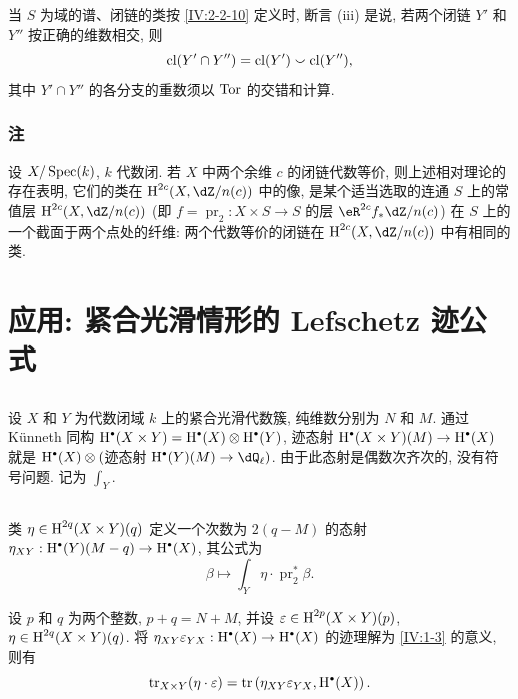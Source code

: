 当 $S$ 为域的谱、闭链的类按 \ref{IV:2-2-10} 定义时,
断言 (iii) 是说, 若两个闭链 $Y'$ 和 $Y''$ 按正确的维数相交, 则
\[
  \operatorname{cl}(Y'\cap Y'') = \operatorname{cl}(Y')\smallsmile \operatorname{cl}(Y'')\text{,}
\]
其中 $Y'\cap Y''$ 的各分支的重数须以 $\operatorname{Tor}$ 的交错和计算.

\subsubsection{注}\label{IV:2-3-10}

设 $X/\operatorname{Spec}(k)$, $k$ 代数闭. 若 $X$ 中两个余维 $c$ 的闭链代数等价,
则上述相对理论的存在表明, 它们的类在 $\h^{2 c}(X,\dZ/n(c))$ 中的像,
是某个适当选取的连通 $S$ 上的常值层 $\h^{2 c}(X,\dZ/n(c))$
(即 $f=\operatorname{pr}_2:X\times S\to S$ 的层 $\eR^{2 c} f_\ast \dZ/n(c)$)
在 $S$ 上的一个截面于两个点处的纤维:
两个代数等价的闭链在 $\h^{2 c}(X,\dZ/n(c))$ 中有相同的类.

\section{应用: 紧合光滑情形的 Lefschetz 迹公式}\label{IV:3}

\subsection{}\label{IV:3-1}

设 $X$ 和 $Y$ 为代数闭域 $k$ 上的紧合光滑代数簇, 纯维数分别为 $N$ 和 $M$.
通过 K\"unneth 同构 $\h^\bullet(X\times Y)=\h^\bullet(X)\otimes \h^\bullet(Y)$,
迹态射 $\h^\bullet(X\times Y)(M)\to \h^\bullet(X)$ 就是
$\h^\bullet(X)\otimes ($迹态射 $\h^\bullet(Y)(M)\to \dQ_\ell)$.
由于此态射是偶数次齐次的, 没有符号问题. 记为 $\int_Y$.

\subsection{}\label{IV:3-2}

类 $\eta\in \operatorname{H}^{2 q}(X\times Y)(q)$ 定义一个次数为 $2(q-M)$ 的态射
$\eta_{XY}:\h^\bullet(Y)(M-q)\to \h^\bullet(X)$, 其公式为
\[
  \beta \mapsto \int_Y \eta\cdot \operatorname{pr}_2^\ast \beta \text{.}
\]

\begin{proposition_}\label{IV:3-3}
设 $p$ 和 $q$ 为两个整数, $p+q=N+M$, 并设
$\varepsilon\in \operatorname{H}^{2 p}(X\times Y)(p)$,
$\eta\in \operatorname{H}^{2 q}(X\times Y)(q)$.
将 $\eta_{X Y}\varepsilon_{Y X}:\h^\bullet(X)\to \h^\bullet(X)$ 的迹理解为 \ref{IV:1-3} 的意义, 则有
\[
  \tr_{X\times Y}(\eta\cdot \varepsilon) = \tr\left(\eta_{X Y}\varepsilon_{Y X},\h^\bullet(X)\right) \text{.}
\]
\end{proposition_}

